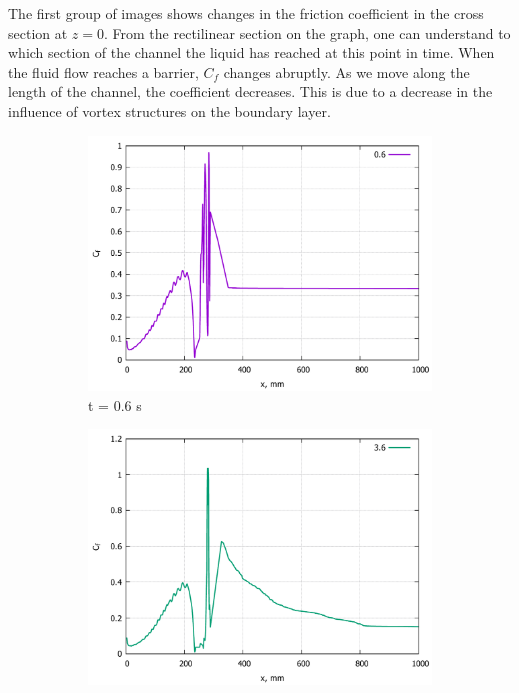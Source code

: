 	The first group of images shows changes in the friction coefficient in the cross section at $z = 0$. From the rectilinear section on the graph, one can understand to which section of the channel the liquid has reached at this point in time. When the fluid flow reaches a barrier, $C_f$ changes abruptly. As we move along the length of the channel, the coefficient decreases. This is due to a decrease in the influence of vortex structures on the boundary layer.
	\begin{figure}[H]
		\begin{subfigure}{.5\textwidth}
			\centering
			\includegraphics[width=1\linewidth]{../Assets/Cf-T06}
			\caption{t = 0.6 s}
			\label{fig:Cf-T06}
		\end{subfigure}%
		\begin{subfigure}{.5\textwidth}
			\centering
			\includegraphics[width=1\linewidth]{../Assets/Cf-T360}

\end{subfigure}
\end{figure}
